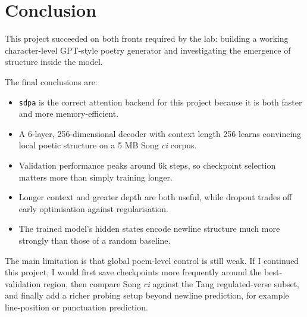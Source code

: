 \documentclass[11pt]{article}
\begin{document}
\section{Conclusion}
This project succeeded on both fronts required by the lab: building a working character-level GPT-style poetry generator and investigating the emergence of structure inside the model.

The final conclusions are:
\begin{itemize}
    \item \texttt{sdpa} is the correct attention backend for this project because it is both faster and more memory-efficient.
    \item A 6-layer, 256-dimensional decoder with context length 256 learns convincing local poetic structure on a 5 MB Song \emph{ci} corpus.
    \item Validation performance peaks around 6k steps, so checkpoint selection matters more than simply training longer.
    \item Longer context and greater depth are both useful, while dropout trades off early optimisation against regularisation.
    \item The trained model's hidden states encode newline structure much more strongly than those of a random baseline.
\end{itemize}

The main limitation is that global poem-level control is still weak. If I continued this project, I would first save checkpoints more frequently around the best-validation region, then compare Song \emph{ci} against the Tang regulated-verse subset, and finally add a richer probing setup beyond newline prediction, for example line-position or punctuation prediction.
\end{document}
